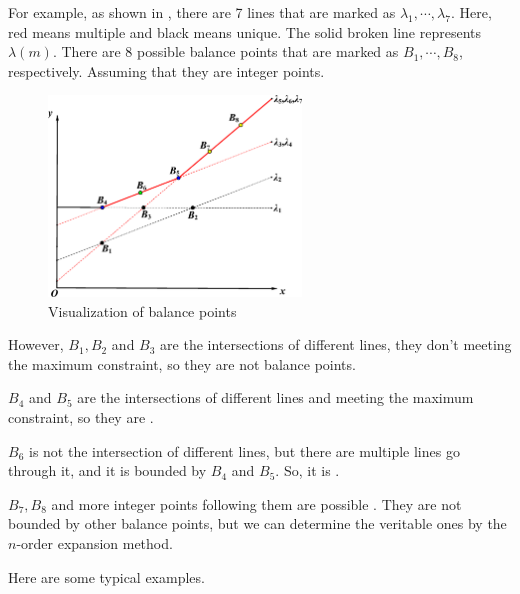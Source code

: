 For example, as shown in , there are 7 lines that are marked as $\lambda_1,\cdots,\lambda_7$. Here, red means multiple and black means unique. The solid broken line represents $\lambda(m)$. There are 8 possible balance points that are marked as $B_1,\cdots,B_8$, respectively. Assuming that they are integer points.
\begin{figure}[H]
\centering
\includegraphics[width=0.6\textwidth]{fig/ps.eps}
\caption{Visualization of balance points}
\label{point}
\end{figure}
\begin{compactitem}[\textbullet]
\item However, $B_1,B_2$ and $B_3$ are the intersections of different lines, they don't meeting the maximum constraint, so they are not balance points.
\item $B_4$ and $B_5$ are the intersections of different lines and meeting the maximum constraint, so they are \BPone{}.
\item $B_6$ is not the intersection of different lines, but there are multiple lines go through it, and it is bounded by $B_4$ and $B_5$. So, it is \BPtwo{}.
\item $B_7,B_8$ and more integer points following them are possible \BPthree{}. They are not bounded by other balance points, but we can determine the veritable ones by the $n$-order expansion method.
\end{compactitem}



Here are some typical examples.

